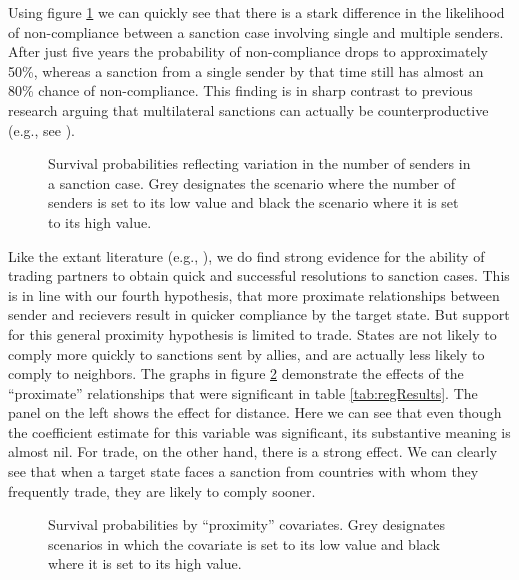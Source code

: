 Using figure \ref{fig:surv1} we can quickly see that there is a stark difference in the likelihood of non-compliance between a sanction case involving single and multiple senders. After just five years the probability of non-compliance drops to approximately 50\%, whereas a sanction from a single sender by that time still has almost an 80\% chance of non-compliance. This finding is in sharp contrast to previous research arguing that multilateral sanctions can actually be counterproductive (e.g., see \citealp{drezner2000bargaining}).

\begin{figure}[ht]
	\centering
	\caption{Survival probabilities reflecting variation in the number of senders in a sanction case. Grey designates the scenario where the number of senders is set to its low value and black the scenario where it is set to its high value.}
	\resizebox{0.7\textwidth}{!}{}
	\label{fig:surv1}
\end{figure}
\FloatBarrier

Like the extant literature (e.g., \citealp{mclean2010friends}), we do find strong evidence for the ability of trading partners to obtain quick and successful resolutions to sanction cases. This is in line with our fourth hypothesis, that more proximate relationships between sender and recievers result in quicker compliance by the target state. But support for this general proximity hypothesis is limited to trade. States are not likely to comply more quickly to sanctions sent by allies, and are actually less likely to comply to neighbors. The graphs in figure \ref{fig:surv2} demonstrate the effects of the ``proximate'' relationships that were significant in table \ref{tab:regResults}. The panel on the left shows the effect for distance. Here we can see that even though the coefficient estimate for this variable was significant, its substantive meaning is almost nil. For trade, on the other hand, there is a strong effect. We can clearly see that when a target state faces a sanction from countries with whom they frequently trade, they are likely to comply sooner.

\begin{figure}[ht]
	\centering
	\caption{Survival probabilities by ``proximity'' covariates. Grey designates scenarios in which the covariate is set to its low value and black where it is set to its high value.}
	\resizebox{1\textwidth}{!}{}	
	\label{fig:surv2}
\end{figure}
\FloatBarrier

